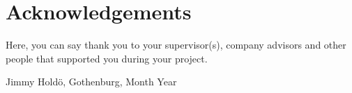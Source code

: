\thispagestyle{plain}			%
\section*{Acknowledgements}
Here, you can say thank you to your supervisor(s), company advisors and other people that supported you during your project.

\vspace{1.5cm}
\hfill
Jimmy Holdö, Gothenburg, Month Year

\newpage				%
\thispagestyle{empty}
\mbox{}